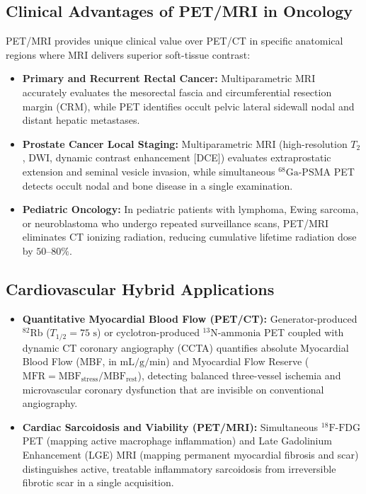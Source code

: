 \documentclass[11pt,a4paper]{article}
\begin{document}
\subsection{Clinical Advantages of PET/MRI in Oncology}
PET/MRI provides unique clinical value over PET/CT in specific anatomical regions where MRI delivers superior soft-tissue contrast:
\begin{itemize}[leftmargin=2em]
    \item \textbf{Primary and Recurrent Rectal Cancer:} Multiparametric MRI accurately evaluates the mesorectal fascia and circumferential resection margin (CRM), while PET identifies occult pelvic lateral sidewall nodal and distant hepatic metastases.
    \item \textbf{Prostate Cancer Local Staging:} Multiparametric MRI (high-resolution $T_2$, DWI, dynamic contrast enhancement [DCE]) evaluates extraprostatic extension and seminal vesicle invasion, while simultaneous $^{68}\text{Ga}\text{-PSMA}$ PET detects occult nodal and bone disease in a single examination.
    \item \textbf{Pediatric Oncology:} In pediatric patients with lymphoma, Ewing sarcoma, or neuroblastoma who undergo repeated surveillance scans, PET/MRI eliminates CT ionizing radiation, reducing cumulative lifetime radiation dose by $50\text{--}80\%$.
\end{itemize}

\subsection{Cardiovascular Hybrid Applications}
\begin{itemize}[leftmargin=2em]
    \item \textbf{Quantitative Myocardial Blood Flow (PET/CT):} Generator-produced $^{82}\text{Rb}$ ($T_{1/2} = 75\text{ s}$) or cyclotron-produced $^{13}\text{N}\text{-ammonia}$ PET coupled with dynamic CT coronary angiography (CCTA) quantifies absolute Myocardial Blood Flow (MBF, in $\text{mL/g/min}$) and Myocardial Flow Reserve ($\text{MFR} = \text{MBF}_{\text{stress}} / \text{MBF}_{\text{rest}}$), detecting balanced three-vessel ischemia and microvascular coronary dysfunction that are invisible on conventional angiography.
    \item \textbf{Cardiac Sarcoidosis and Viability (PET/MRI):} Simultaneous $^{18}\text{F}\text{-FDG}$ PET (mapping active macrophage inflammation) and Late Gadolinium Enhancement (LGE) MRI (mapping permanent myocardial fibrosis and scar) distinguishes active, treatable inflammatory sarcoidosis from irreversible fibrotic scar in a single acquisition.
\end{itemize}
\end{document}
